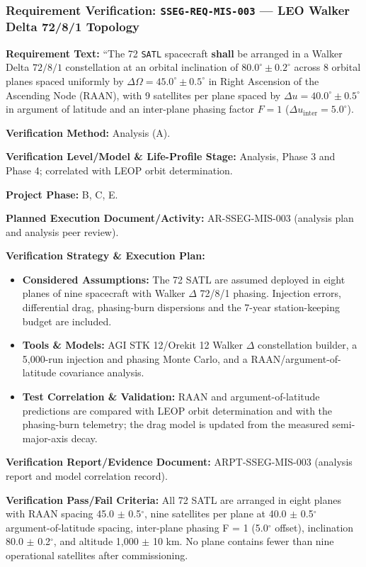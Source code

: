 \subsubsection{Requirement Verification: \texttt{SSEG-REQ-MIS-003} --- LEO Walker Delta 72/8/1 Topology}
\label{ver:SSEG-REQ-MIS-003}
\textbf{Requirement Text:} ``The 72 \texttt{SATL} spacecraft \textbf{shall} be arranged in a Walker Delta $72/8/1$ constellation at an orbital inclination of $80.0^\circ \pm 0.2^\circ$ across 8 orbital planes spaced uniformly by $\Delta\Omega = 45.0^\circ \pm 0.5^\circ$ in Right Ascension of the Ascending Node (RAAN), with 9 satellites per plane spaced by $\Delta u = 40.0^\circ \pm 0.5^\circ$ in argument of latitude and an inter-plane phasing factor $F = 1$ ($\Delta u_{\text{inter}} = 5.0^\circ$).
\par\textbf{Verification Method:} Analysis (A).
\par\textbf{Verification Level/Model \& Life-Profile Stage:} Analysis, Phase 3 and Phase 4; correlated with LEOP orbit determination.
\par\textbf{Project Phase:} B, C, E.
\par\textbf{Planned Execution Document/Activity:} AR-SSEG-MIS-003 (analysis plan and analysis peer review).
\par\textbf{Verification Strategy \& Execution Plan:}
\begin{itemize}
\item \textbf{Considered Assumptions:} The 72 SATL are assumed deployed in eight planes of nine spacecraft with Walker $\Delta$ 72/8/1 phasing. Injection errors, differential drag, phasing-burn dispersions and the 7-year station-keeping budget are included.
\item \textbf{Tools \& Models:} AGI STK 12/Orekit 12 Walker $\Delta$ constellation builder, a 5,000-run injection and phasing Monte Carlo, and a RAAN/argument-of-latitude covariance analysis.
\item \textbf{Test Correlation \& Validation:} RAAN and argument-of-latitude predictions are compared with LEOP orbit determination and with the phasing-burn telemetry; the drag model is updated from the measured semi-major-axis decay.
\end{itemize}
\par\textbf{Verification Report/Evidence Document:} ARPT-SSEG-MIS-003 (analysis report and model correlation record).
\par\textbf{Verification Pass/Fail Criteria:} All 72 SATL are arranged in eight planes with RAAN spacing 45.0 $\pm$ 0.5$^\circ$, nine satellites per plane at 40.0 $\pm$ 0.5$^\circ$ argument-of-latitude spacing, inter-plane phasing F = 1 (5.0$^\circ$ offset), inclination 80.0 $\pm$ 0.2$^\circ$, and altitude 1,000 $\pm$ 10 km. No plane contains fewer than nine operational satellites after commissioning.
\par\medskip
